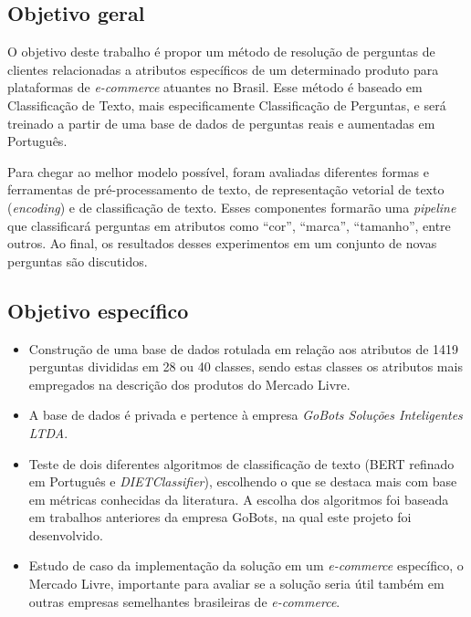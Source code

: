 \subsection{Objetivo geral}
O objetivo deste trabalho é propor um método de resolução de perguntas de clientes relacionadas a atributos específicos de um determinado produto para plataformas de \textit{e-commerce} atuantes no Brasil. Esse método é baseado em Classificação de Texto, mais especificamente Classificação de Perguntas, e será treinado a partir de uma base de dados de perguntas reais e aumentadas em Português.

Para chegar ao melhor modelo possível, foram avaliadas diferentes formas e ferramentas de pré-processamento de texto, de representação vetorial de texto (\textit{encoding}) e de classificação de texto. Esses componentes formarão uma \textit{pipeline} que classificará perguntas em atributos como ``cor'', ``marca'', ``tamanho'', entre outros. Ao final, os resultados desses experimentos em um conjunto de novas perguntas são discutidos.

\subsection{Objetivo específico}
\begin{itemize}
    \item Construção de uma base de dados rotulada em relação aos atributos de 1419 perguntas divididas em 28 ou 40 classes, sendo estas classes os atributos mais empregados na descrição dos produtos do Mercado Livre. 
    \item A base de dados é privada e pertence à empresa \textit{GoBots Soluções Inteligentes LTDA}.
    \item Teste de dois diferentes algoritmos de classificação de texto (BERT refinado em Português e \textit{DIETClassifier}), escolhendo o que se destaca mais com base em métricas conhecidas da literatura. A escolha dos algoritmos foi baseada em trabalhos anteriores da empresa GoBots, na qual este projeto foi desenvolvido.
    \item Estudo de caso da implementação da solução em um \textit{e-commerce} específico, o Mercado Livre, importante para avaliar se a solução seria útil também em outras empresas semelhantes brasileiras de \textit{e-commerce}. 
\end{itemize}

